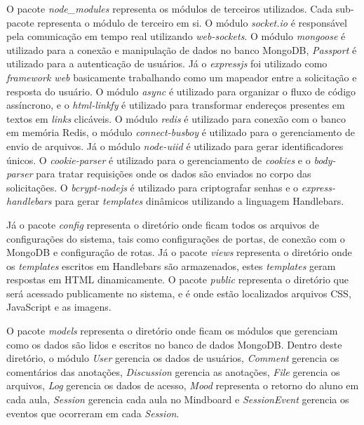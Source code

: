 O pacote \emph{node\_modules} representa os módulos de terceiros utilizados. Cada sub-pacote representa o módulo de terceiro em si. O módulo \emph{socket.io} é responsável pela comunicação em tempo real utilizando \emph{web-sockets}. O módulo \emph{mongoose} é utilizado para a conexão e manipulação de dados no banco MongoDB, \emph{Passport} é utilizado para a autenticação de usuários. Já o \emph{expressjs} foi utilizado como \emph{framework web} basicamente trabalhando como um mapeador entre a solicitação e resposta do usuário. O módulo \emph{async} é utilizado para organizar o fluxo de código assíncrono, e o \emph{html-linkfy} é utilizado para transformar endereços presentes em textos em \emph{links} clicáveis. O módulo \emph{redis} é utilizado para conexão com o banco em memória Redis, o módulo \emph{connect-busboy} é utilizado para o gerenciamento de envio de arquivos. Já o módulo \emph{node-uiid} é utilizado para gerar identificadores únicos. O \emph{cookie-parser} é utilizado para o gerenciamento de \emph{cookies} e o \emph{body-parser} para tratar requisições onde os dados são enviados no corpo das solicitações. O \emph{bcrypt-nodejs} é utilizado para criptografar senhas e o \emph{express-handlebars} para gerar \emph{templates} dinâmicos utilizando a linguagem Handlebars. 


Já o pacote \emph{config} representa o diretório onde ficam todos os arquivos de configurações do sistema, tais como configurações de portas, de conexão com o MongoDB e configuração de rotas. Já o pacote \emph{views} representa o diretório onde os \emph{templates} escritos em Handlebars são armazenados, estes \emph{templates} geram respostas em HTML dinamicamente. O pacote \emph{public} representa o diretório que será acessado publicamente no sistema, e é onde estão localizados arquivos CSS, JavaScript e as imagens.

O pacote \emph{models} representa o diretório onde ficam os módulos que gerenciam como os dados são lidos e escritos no banco de dados MongoDB. Dentro deste diretório, o módulo \emph{User} gerencia os dados de usuários, \emph{Comment} gerencia os comentários das anotações, \emph{Discussion} gerencia as anotações, \emph{File} gerencia os arquivos, \emph{Log} gerencia os dados de acesso, \emph{Mood} representa o retorno do aluno em cada aula, \emph{Session} gerencia cada aula no Mindboard e \emph{SessionEvent} gerencia os eventos que ocorreram em cada \emph{Session}.

